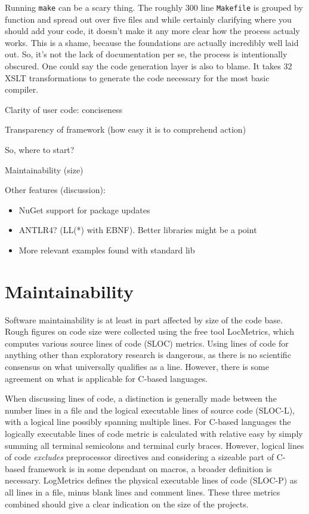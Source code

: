 \documentclass[twoside,openright]{uva-bachelor-thesis}
\newcommand{\code}[1]{\texttt{\footnotesize#1}}
\begin{document}
		Running \code{make} can be a scary thing. The roughly 300 line \code{Makefile} is grouped by function and spread out over five files and while certainly clarifying where you should add your code, it doesn't make it any more clear how the process actualy works. This is a shame, because the foundations are actually incredibly well laid out. So, it's not the lack of documentation per se, the process is intentionally obscured. One could say the code generation layer is also to blame. It takes 32 XSLT transformations to generate the code necessary for the most basic compiler.
		
			Clarity of user code: conciseness
			
			Transparency of framework (how easy it is to comprehend action)
			
			So, where to start?
			
			
			
			Maintainability (size)
			
			Other features (discussion):
			\begin{itemize}
			\item NuGet support for package updates
			\item ANTLR4? (LL(*) with EBNF). Better libraries might be a point
			\item More relevant examples found with standard lib
			\
			\end{itemize}
		
	
	\section{Maintainability}
		Software maintainability is at least in part affected by size of the code base. Rough figures on code size were collected using the free tool LocMetrics, which computes various source lines of code (SLOC) metrics. Using lines of code for anything other than exploratory research is dangerous, as there is no scientific consensus on what universally qualifies as a line. However, there is some agreement on what is applicable for C-based languages.
		
		When discussing lines of code, a distinction is generally made between the number lines in a file and the logical executable lines of source code (SLOC-L), with a logical line possibly spanning multiple lines. For C-based languages the logically executable lines of code metric is calculated with relative easy by simply summing all terminal semicolons and terminal curly braces\cite{nguyen2007sloc}. However, logical lines of code \emph{excludes} preprocessor directives and considering a sizeable part of C-based framework is in some dependant on macros, a broader definition is necessary. LogMetrics defines the physical executable lines of code (SLOC-P) as all lines in a file, minus blank lines and comment lines. These three metrics combined should give a clear indication on the size of the projects.
		
\end{document}
